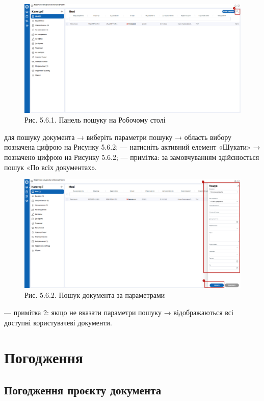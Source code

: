 \begin{figure}[!htbp]
\centerline{\includegraphics[width=\textwidth]{img/5.6.1.png}}
\caption{Рис. 5.6.1. Панель пошуку на Робочому столі}
\end{figure}

для пошуку документа → виберіть параметри пошуку → область вибору позначена цифрою  на Рисунку 5.6.2;
--- натисніть активний елемент «Шукати» → позначено цифрою  на Рисунку 5.6.2;
--- примітка: за замовчуванням здійснюється пошук «По всіх документах».

\begin{figure}[!htbp]
\centerline{\includegraphics[width=\textwidth]{img/5.6.2.png}}
\caption{Рис. 5.6.2. Пошук документа за параметрами}
\end{figure}

--- примітка 2: якщо не вказати параметри пошуку → відображаються всі
доступні користувачеві документи. 

\section{Погодження}

\subsection{Погодження проєкту документа}

